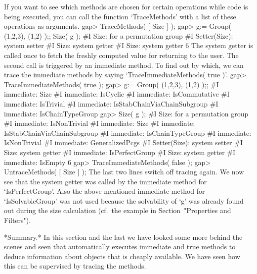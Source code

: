 If you want to see which methods  are chosen for certain operations while
{\GAP}  code is being executed,  you can call the function `TraceMethods'
with a list of these operations as arguments.
\beginexample
gap> TraceMethods( [ Size ] );
gap> g:= Group( (1,2,3), (1,2) );;  Size( g );
#I  Size: for a permutation group
#I  Setter(Size): system setter
#I  Size: system getter
#I  Size: system getter
6
\endexample
The system getter is called once to fetch  the freshly computed value for
returning  to the user.  The  second  call is  triggered by  an immediate
method. To  find out  by which,  we can trace   the immediate  methods by
saying `TraceImmediateMethods( true )'.
\beginexample
gap> TraceImmediateMethods( true );
gap> g:= Group( (1,2,3), (1,2) );;
#I  immediate: Size
#I  immediate: IsCyclic
#I  immediate: IsCommutative
#I  immediate: IsTrivial
#I  immediate: IsStabChainViaChainSubgroup
#I  immediate: IsChainTypeGroup
gap> Size( g );
#I  Size: for a permutation group
#I  immediate: IsNonTrivial
#I  immediate: Size
#I  immediate: IsStabChainViaChainSubgroup
#I  immediate: IsChainTypeGroup
#I  immediate: IsNonTrivial
#I  immediate: GeneralizedPcgs
#I  Setter(Size): system setter
#I  Size: system getter
#I  immediate: IsPerfectGroup
#I  Size: system getter
#I  immediate: IsEmpty
6
gap> TraceImmediateMethods( false );
gap> UntraceMethods( [ Size ] );
\endexample
The last two lines switch off tracing  again. We now  see that the system
getter was called by the immediate method for `IsPerfectGroup'. 
Also the above-mentioned immediate method for `IsSolvableGroup'
was not used because the solvability of `g'  was already found out during
the size calculation
(cf.~the example in Section~"Properties and Filters").

*Summary.*  In this section  and the  last we have  looked some  more
behind the  scenes and seen  that {\GAP} automatically executes immediate
and true  methods  to deduce  information about  objects  that is cheaply
available.  We  have seen how   this  can be  supervised  by tracing  the
methods.


